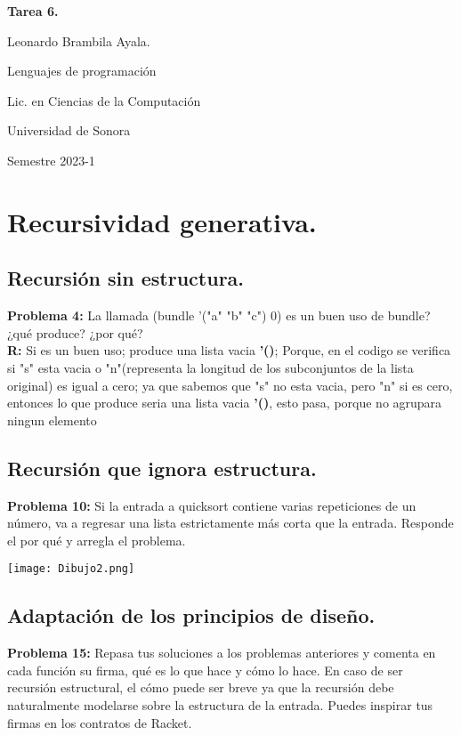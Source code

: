 \documentclass[letterpaper,12pt]{article}
\begin{document}
\begin{center}
  \textbf{Tarea 6.}\par
  \bigskip
  Leonardo Brambila Ayala.\par
  \bigskip
  Lenguajes de programación\par
  Lic. en Ciencias de la Computación\par
  Universidad de Sonora\par
  Semestre 2023-1\par
\end{center}

\section{ Recursividad generativa.}
\subsection {Recursión sin estructura.}

\textbf{Problema 4: }\text La llamada (bundle '("a" "b" "c") 0) es un buen uso de
bundle? ¿qué produce? ¿por qué?\\
\textbf{R: }\text  Si es un buen uso; produce una lista vacia \textbf{'()}; Porque, en el codigo se verifica si "s" esta vacia o "n"(representa la longitud de los subconjuntos de la lista original) es igual a cero; ya que sabemos que "s" no esta vacia, pero "n" si es cero, entonces lo que produce seria una lista vacia \textbf{'()}, esto pasa, porque no agrupara ningun elemento

\subsection {Recursión que ignora estructura.}
\textbf{Problema 10: }\text Si la entrada a quicksort contiene varias repeticiones de un número, va a regresar una lista estrictamente más corta que la entrada. Responde el por qué y arregla el problema.\\

\begin{center}
\texttt{[image: Dibujo2.png]}    
\end{center}

\subsection{Adaptación de los principios de diseño.}
\textbf{Problema 15: }\text Repasa tus soluciones a los problemas anteriores y comenta en
cada función su firma, qué es lo que hace y cómo lo hace. En caso de ser recursión estructural, el cómo puede ser breve ya que la recursión debe naturalmente
modelarse sobre la estructura de la entrada. Puedes inspirar tus firmas en los
contratos de Racket.
\end{document}
